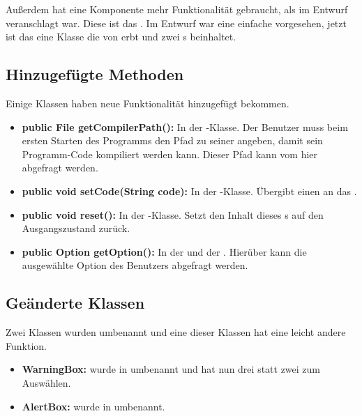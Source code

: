 Außerdem hat eine Komponente mehr Funktionalität gebraucht, als im Entwurf veranschlagt war. Diese ist das .
Im Entwurf war eine einfache  vorgesehen, jetzt ist das  eine Klasse die von  erbt und zwei s beinhaltet.

\subsection{Hinzugefügte Methoden}


Einige Klassen haben neue Funktionalität hinzugefügt bekommen.

\begin{itemize}

	\item \textbf{public File getCompilerPath():} In der -Klasse. Der Benutzer muss beim ersten Starten des Programms den Pfad zu seiner  angeben, damit sein Programm-Code kompiliert werden kann. Dieser Pfad kann vom  hier abgefragt werden.

	\item \textbf{public void setCode(String code):} In der -Klasse.
Übergibt einen  an das .

	\item \textbf{public void reset():} In der -Klasse. Setzt den Inhalt dieses s auf den Ausgangszustand zurück.

	\item \textbf{public Option getOption():} In der  und der . Hierüber kann die ausgewählte Option des Benutzers abgefragt werden.

\end{itemize}

\subsection{Geänderte Klassen}


Zwei Klassen wurden umbenannt und eine dieser Klassen hat eine leicht andere Funktion.

\begin{itemize}
	\item \textbf{WarningBox:} wurde in  umbenannt und hat nun drei statt zwei  zum Auswählen.

	\item \textbf{AlertBox:} wurde in  umbenannt.
\end{itemize}

